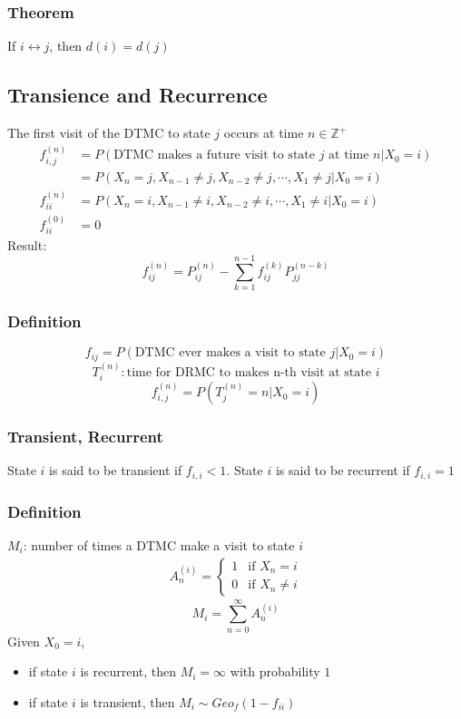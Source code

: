 \documentclass[11pt]{article}
\newcommand{\Z}{{\mathbb{Z}}}
\begin{document}
\subsubsection{Theorem}
If $i\leftrightarrow j$, then $d(i)=d(j)$
\subsection{Transience and Recurrence}
The first visit of the DTMC to state $j$ occurs at time $n\in\Z^+$ 
\begin{align*}
    f_{i,j}^{(n)} &= P(\text{DTMC makes a future visit to state } j \text{ at time } n|X_0=i) \\
    &= P(X_n=j, X_{n-1}\neq j, X_{n-2}\neq j, \cdots, X_1\neq j | X_0=i) \\
    f_{ii}^{(n)} &= P(X_n=i, X_{n-1}\neq i, X_{n-2}\neq i, \cdots, X_1\neq i | X_0=i) \\
    f_{ii}^{(0)} &= 0
\end{align*}
Result: 
\[f_{ij}^{(n)} = P_{ij}^{(n)} - \sum_{k=1}^{n-1}f_{ij}^{(k)}P_{jj}^{(n-k)}\]    
\subsubsection*{Definition}
\[f_{ij} = P(\text{DTMC ever makes a visit to state } j|X_0=i)\]    
\[T_i^{(n)}: \text{time for DRMC to makes n-th visit at state } i\]    
\[f_{i,j}^{(n)} = P(T_j^{(n)} = n | X_0=i)\]    
\subsubsection{Transient, Recurrent}
State $i$ is said to be transient if $f_{i,i}<1$. State $i$ is said to be recurrent if $f_{i,i}=1$
\subsubsection*{Definition}
$M_i$: number of times a DTMC make a visit to state $i$
\begin{align*}
    A_n^{(i)} = 
    \begin{cases}
        1 & \text{if } X_n=i \\
        0 & \text{if } X_n\neq i
    \end{cases}
\end{align*}
\[M_i = \sum_{n=0}^{\infty}A_n^{(i)}\]
Given $X_0=i$, 
\begin{itemize}
    \item if state $i$ is recurrent, then $M_i=\infty$ with probability $1$
    \item if state $i$ is transient, then $M_i\sim Geo_f(1-f_{ii})$
\end{itemize}
\end{document}
